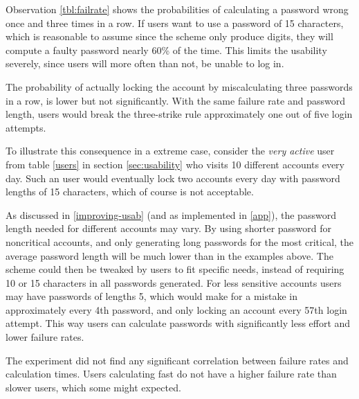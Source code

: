 \par Observation \ref{tbl:failrate} shows the probabilities of calculating a password wrong once and three times in a row. If users want to use a password of 15 characters, which is reasonable to assume since the scheme only produce digits, they will compute a faulty password nearly 60\% of the time. This limits the usability severely, since users will more often than not, be unable to log in.
\par The probability of actually locking the account by miscalculating three passwords in a row, is lower but not significantly. With the same failure rate and password length, users would break the three-strike rule approximately one out of five login attempts.

\par To illustrate this consequence in a extreme case, consider the \emph{very active} user from table \ref{users} in section \ref{sec:usability} who visits 10 different accounts every day. Such an user would eventually lock two accounts every day with password lengths of 15 characters, which of course is not acceptable.

\par As discussed in \autoref{improving-usab} (and as implemented in \autoref{app}), the password length needed for different accounts may vary. By using shorter password for noncritical accounts, and only generating long passwords for the most critical, the average password length will be much lower than in the examples above. The scheme could then be tweaked by users to fit specific needs, instead of requiring 10 or 15 characters in all passwords generated. For less sensitive accounts users may have passwords of lengths 5, which would make for a mistake in approximately every 4th password, and only locking an account every 57th login attempt. This way users can calculate passwords with significantly less effort and lower failure rates. 

\par The experiment did not find any significant correlation between failure rates and calculation times. Users calculating fast do not have a higher failure rate than slower users, which some might expected. 

